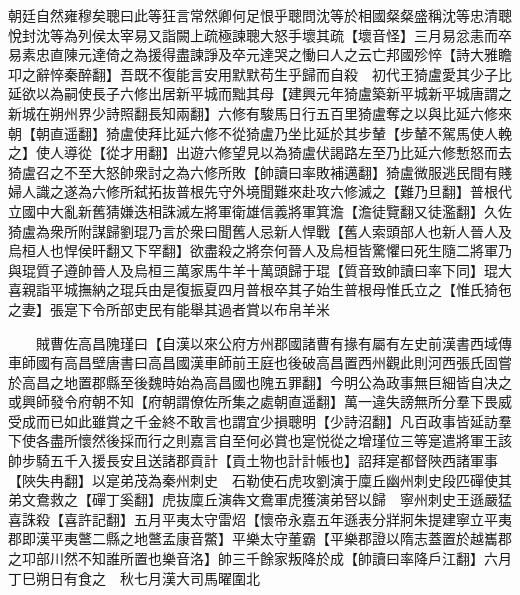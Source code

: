 朝廷自然雍穆矣聰曰此等狂言常然卿何足恨乎聰問沈等於相國粲粲盛稱沈等忠清聰悅封沈等為列侯太宰易又詣闕上疏極諫聰大怒手壞其疏【壞音怪】三月易忿恚而卒易素忠直陳元達倚之為援得盡諫諍及卒元達哭之慟曰人之云亡邦國殄悴【詩大雅瞻卭之辭悴秦醉翻】吾既不復能言安用默默苟生乎歸而自殺　初代王猗盧愛其少子比延欲以為嗣使長子六修出居新平城而黜其母【建興元年猗盧築新平城新平城唐謂之新城在朔州界少詩照翻長知兩翻】六修有駿馬日行五百里猗盧奪之以與比延六修來朝【朝直遥翻】猗盧使拜比延六修不從猗盧乃坐比延於其步輦【步輦不駕馬使人輓之】使人導從【從才用翻】出遊六修望見以為猗盧伏謁路左至乃比延六修慙怒而去猗盧召之不至大怒帥衆討之為六修所敗【帥讀曰率敗補邁翻】猗盧微服逃民間有賤婦人識之遂為六修所弑拓抜普根先守外境聞難來赴攻六修滅之【難乃旦翻】普根代立國中大亂新舊猜嫌迭相誅滅左將軍衛雄信義將軍箕澹【澹徒覽翻又徒濫翻】久佐猗盧為衆所附謀歸劉琨乃言於衆曰聞舊人忌新人悍戰【舊人索頭部人也新人晉人及烏桓人也悍侯旰翻又下罕翻】欲盡殺之將奈何晉人及烏桓皆驚懼曰死生隨二將軍乃與琨質子遵帥晉人及烏桓三萬家馬牛羊十萬頭歸于琨【質音致帥讀曰率下同】琨大喜親詣平城撫納之琨兵由是復振夏四月普根卒其子始生普根母惟氏立之【惟氏猗㐌之妻】張寔下令所部吏民有能舉其過者賞以布帛羊米

　　賊曹佐高昌隗瑾曰【自漢以來公府方州郡國諸曹有掾有屬有左史前漢書西域傳車師國有高昌壁唐書曰高昌國漢車師前王庭也後破高昌置西州觀此則河西張氏固嘗於高昌之地置郡縣至後魏時始為高昌國也隗五罪翻】今明公為政事無巨細皆自决之或興師發令府朝不知【府朝謂僚佐所集之處朝直遥翻】萬一違失謗無所分羣下畏威受成而已如此雖賞之千金終不敢言也謂宜少損聰明【少詩沼翻】凡百政事皆延訪羣下使各盡所懷然後採而行之則嘉言自至何必賞也寔悦從之增瑾位三等寔遣將軍王該帥步騎五千入援長安且送諸郡貢計【貢土物也計計帳也】詔拜寔都督陜西諸軍事【陜失冉翻】以寔弟茂為秦州刺史　石勒使石虎攻劉演于廩丘幽州刺史段匹磾使其弟文鴦救之【磾丁奚翻】虎抜廩丘演犇文鴦軍虎獲演弟唘以歸　寧州刺史王遜嚴猛喜誅殺【喜許記翻】五月平夷太守雷炤【懷帝永嘉五年遜表分牂牁朱提建寧立平夷郡即漢平夷鄨二縣之地鄨孟康音鱉】平樂太守董霸【平樂郡證以隋志蓋置於越巂郡之卭部川然不知誰所置也樂音洛】帥三千餘家叛降於成【帥讀曰率降戶江翻】六月丁巳朔日有食之　秋七月漢大司馬曜圍北

